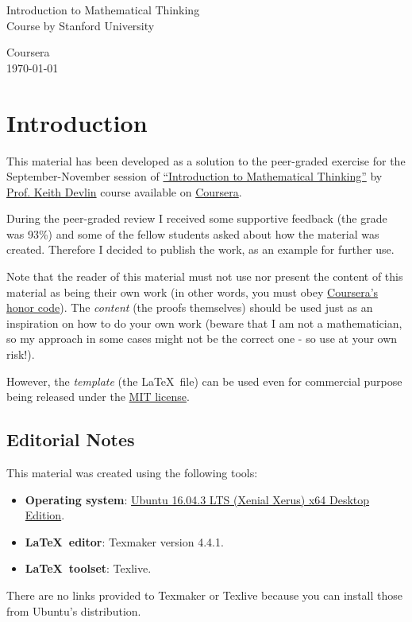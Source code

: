 \documentclass[12pt,letter]{memoir}
\newcommand{\fastCenter}[1]{
\begin{center}
\Large{#1}
\end{center}
}
\newcommand{\titlepage}[1]{
\fastCenter{Introduction to Mathematical Thinking\\Course by Stanford University}
\vspace{\fill}
\begin{center}
\HUGE{#1}
\end{center}
\vspace{\fill}
\fastCenter{Coursera\\\today}}
\begin{document}
\tightlists

\frontmatter
\pagestyle{empty}

\titlepage{\textbf{Peer-graded Assignment}}
\cleardoublepage

\pagestyle{headings}
\tableofcontents
\newpage
\mainmatter
{}
%

\chapter*{Introduction}
This material has been developed as a solution to the peer-graded exercise for the September-November session of \href{https://www.coursera.org/learn/mathematical-thinking}{``Introduction to Mathematical Thinking''} by \href{http://profkeithdevlin.com/}{Prof. Keith Devlin} course available on \href{http://www.coursera.com}{Coursera}.

During the peer-graded review I received some supportive feedback (the grade was 93\%) and some of the fellow students asked about how the material was created. Therefore I decided to publish the work, as an example for further use.

Note that the reader of this material must not use nor present the content of this material as being their own work (in other words, you must obey \href{https://learner.coursera.help/hc/en-us/articles/209818863-Coursera-Honor-Code}{Coursera's honor code}). The \emph{content} (the proofs themselves) should be used just as an inspiration on how to do your own work (beware that I am not a mathematician, so my approach in some cases might not be the correct one - so use at your own risk!).

However, the \emph{template} (the \LaTeX~file) can be used even for commercial purpose being released under the \href{https://github.com/themeshter/learn/blob/master/LICENSE}{MIT license}.

\section{Editorial Notes}
This material was created using the following tools:
\begin{itemize}
\item \textbf{Operating system}: \href{http://releases.ubuntu.com/16.04/}{Ubuntu 16.04.3 LTS (Xenial Xerus) x64 Desktop Edition}.
\item \textbf{\LaTeX~editor}: Texmaker version 4.4.1.
\item \textbf{\LaTeX~toolset}: Texlive.
\end{itemize}
There are no links provided to Texmaker or Texlive because you can install those from Ubuntu's distribution.
\end{document}
